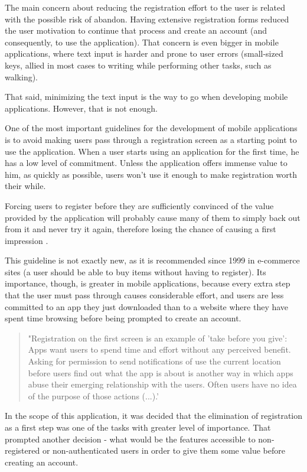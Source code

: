 The main concern about reducing the registration effort to the user is related with the possible risk of abandon. Having extensive registration forms reduced the user motivation to continue that process and create an account (and consequently, to use the application). That concern is even bigger in mobile applications, where text input is harder and prone to user errors (small-sized keys, allied in most cases to writing while performing other tasks, such as walking).

That said, minimizing the text input is the way to go when developing mobile applications. However, that is not enough.

One of the most important guidelines for the development of mobile applications is to avoid making users pass through a registration screen as a starting point to use the application. 
When a user starts using an application for the first time, he has a low level of commitment. Unless the application offers immense value to him, as quickly as possible, users won't use it enough to make registration worth their while. 

Forcing users to register before they are sufficiently convinced of the value provided by the application will probably cause many of them to simply back out from it and never try it again, therefore losing the chance of causing a first impression \cite{kn: NB12}.

This guideline is not exactly new, as it is recommended since 1999 in e-commerce sites (a user should be able to buy items without having to register). Its importance, though, is greater in mobile applications, because every extra step that the user must pass through causes considerable effort, and users are less committed to an app they just downloaded than to a website where they have spent time browsing before being prompted to create an account.

\begin{quote}
"Registration on the first screen is an example of 'take before you give': Apps want users to spend time and effort without any perceived benefit. Asking for permission to send notifications of use the current location before users find out what the app is about is another way in which apps abuse their emerging relationship with the users. Often users have no idea of the purpose of those actions (...).' \cite{kn: NB12}
\end{quote}


In the scope of this application, it was decided that the elimination of registration as a first step was one of the tasks with greater level of importance. That prompted another decision - what would be the features accessible to non-registered or non-authenticated users in order to give them some value before creating an account. 

